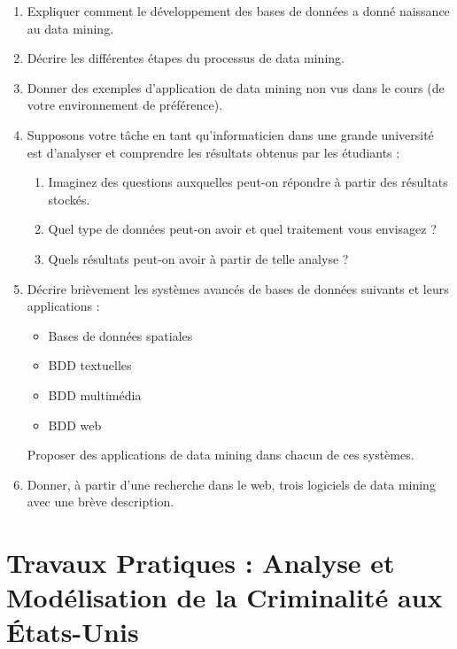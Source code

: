 \documentclass[a4paper,14pt]{article}
\begin{document}
    \begin{enumerate}[leftmargin=*, label=\arabic*)]
        \item Expliquer comment le développement des bases de données a donné naissance au data mining.
        
        \item Décrire les différentes étapes du processus de data mining.
        
        \item Donner des exemples d'application de data mining non vus dans le cours (de votre environnement de préférence).
        
        \item Supposons votre tâche en tant qu'informaticien dans une grande université est d'analyser et comprendre les résultats obtenus par les étudiants :
        \begin{enumerate}[label=\alph*)]
            \item Imaginez des questions auxquelles peut-on répondre à partir des résultats stockés.
            \item Quel type de données peut-on avoir et quel traitement vous envisagez ?
            \item Quels résultats peut-on avoir à partir de telle analyse ?
        \end{enumerate}
        
        \item Décrire brièvement les systèmes avancés de bases de données suivants et leurs applications : 
        \begin{itemize}[leftmargin=4mm]
            \item Bases de données spatiales
            \item BDD textuelles
            \item BDD multimédia
            \item BDD web
        \end{itemize}
        Proposer des applications de data mining dans chacun de ces systèmes.
        
        \item Donner, à partir d'une recherche dans le web, trois logiciels de data mining avec une brève description.
    \end{enumerate}

    \newpage

    \section*{Travaux Pratiques : Analyse et Modélisation de la Criminalité aux États-Unis}
    \vspace{1cm}
\end{document}

